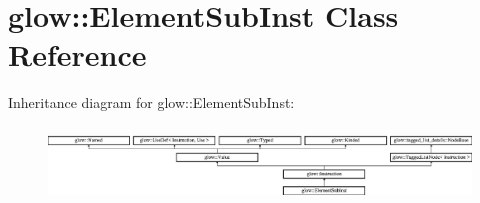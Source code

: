 \hypertarget{classglow_1_1_element_sub_inst}{}\section{glow\+:\+:Element\+Sub\+Inst Class Reference}
\label{classglow_1_1_element_sub_inst}
Inheritance diagram for glow\+:\+:Element\+Sub\+Inst\+:\begin{figure}[H]
\begin{center}
\leavevmode
\includegraphics[height=1.991111cm]{classglow_1_1_element_sub_inst}
\end{center}
\end{figure}
